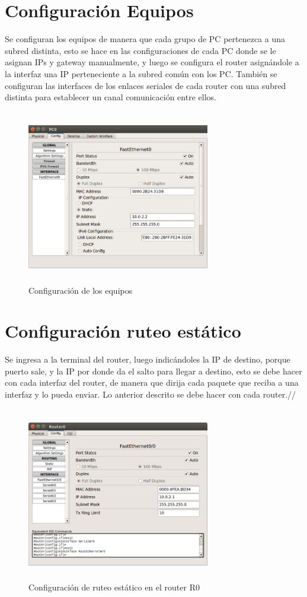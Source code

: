 \documentclass{udpreport}
\begin{document}
	\section{Configuración Equipos}
	Se configuran los equipos de manera que cada grupo de PC pertenezca a una subred distinta, esto se hace en las configuraciones de cada PC donde se le asignan IPs y gateway manualmente, y luego se configura el router asignándole a la interfaz una IP perteneciente a la subred común con los PC. También se configuran las interfaces de los enlaces seriales de cada router con una subred distinta para establecer un canal comunicación entre ellos.
	\begin{figure}[h]
	\centering
	\includegraphics[width=8cm, height=7.6cm]{PC0.png}
	\caption{Configuración de los equipos}
	\end{figure}
	\newpage
	\section{Configuración ruteo estático}
	Se ingresa a la terminal del router, luego indicándoles la IP de destino, porque puerto sale, y la IP por donde da el salto para llegar a destino, esto se debe hacer con cada interfaz del router, de manera que dirija cada paquete que reciba a una interfaz y lo pueda enviar. Lo anterior descrito se debe hacer con cada router.//
	\begin{figure}[h]
	\centering
	\includegraphics[width=8cm, height=7.6cm]{Router0.png}
	\caption{Configuración de ruteo estático en el router R0}
	\end{figure}
	\newpage
\end{document}
